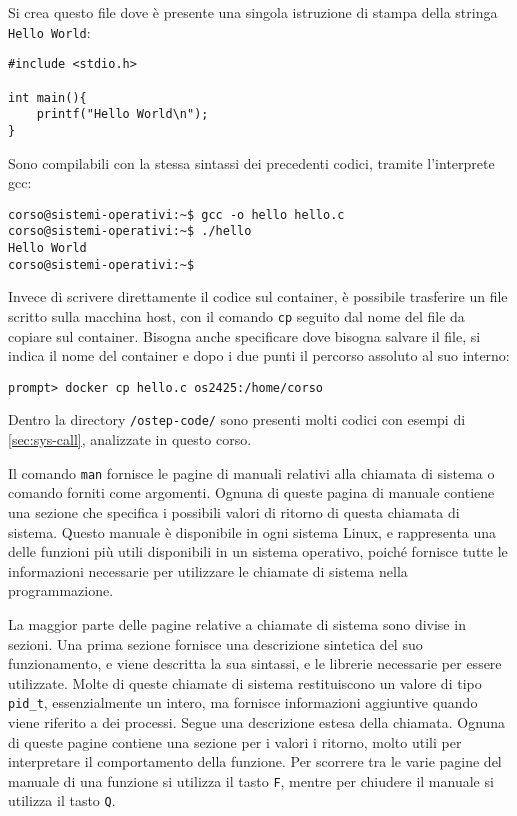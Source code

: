 \documentclass{article}
\numberwithin{equation}{subsection}
\begin{document}
Si crea questo file dove è presente una singola istruzione di stampa della stringa \verb|Hello World|:
\begin{verbatim}
#include <stdio.h>

int main(){
    printf("Hello World\n");
}
\end{verbatim}

Sono compilabili con la stessa sintassi dei precedenti codici, tramite l'interprete gcc:
\begin{verbatim}
corso@sistemi-operativi:~$ gcc -o hello hello.c
corso@sistemi-operativi:~$ ./hello
Hello World
corso@sistemi-operativi:~$
\end{verbatim}

Invece di scrivere direttamente il codice sul container, è possibile trasferire un file scritto sulla macchina host, con il comando \verb|cp| 
seguito dal nome del file da copiare sul container. Bisogna anche specificare dove bisogna salvare il file, si indica il nome del container e dopo i due punti il percorso 
assoluto al suo interno:
\begin{verbatim}
prompt> docker cp hello.c os2425:/home/corso 
\end{verbatim}


Dentro la directory \verb|/ostep-code/| sono presenti molti codici con esempi di \ref{sec:sys-call}, analizzate in questo corso. 

Il comando \verb|man| fornisce le pagine di manuali relativi alla chiamata di sistema o comando forniti come argomenti. Ognuna di queste pagina di manuale contiene una 
sezione che specifica i possibili valori di ritorno di questa chiamata di sistema. Questo manuale è disponibile in ogni sistema Linux, e rappresenta una delle 
funzioni più utili disponibili in un sistema operativo, poiché fornisce tutte le informazioni necessarie per utilizzare le chiamate di sistema nella programmazione. 

La maggior parte delle pagine relative a chiamate di sistema sono divise in sezioni. Una prima sezione fornisce una descrizione sintetica del suo funzionamento, 
e viene descritta la sua sintassi, e le librerie necessarie per essere utilizzate. Molte di queste chiamate di sistema restituiscono un valore di tipo \verb|pid_t|, 
essenzialmente un intero, ma fornisce informazioni aggiuntive quando viene riferito a dei processi. Segue una descrizione estesa della chiamata. 
Ognuna di queste pagine contiene una sezione per i valori i ritorno, molto utili per interpretare il comportamento della funzione. 
Per scorrere tra le varie pagine del manuale di una funzione si utilizza il tasto \verb|F|, mentre per chiudere il manuale si utilizza il tasto \verb|Q|. 
\end{document}
